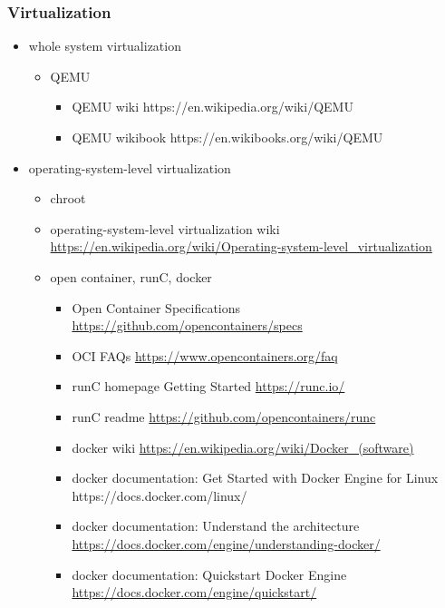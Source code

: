 \documentclass{article}
\begin{document}
\subsubsection{Virtualization}
%
\begin{itemize}
        \item whole system virtualization
            \begin{itemize}
                \item QEMU
                    \begin{itemize}
                        \item QEMU wiki https://en.wikipedia.org/wiki/QEMU
                        \item QEMU wikibook https://en.wikibooks.org/wiki/QEMU
                    \end{itemize}
            \end{itemize}
        \item operating-system-level virtualization
            \begin{itemize}
                \item chroot
                \item operating-system-level virtualization wiki \url{https://en.wikipedia.org/wiki/Operating-system-level_virtualization}
                \item open container, runC, docker
                    \begin{itemize}
                        \item Open Container Specifications \url{https://github.com/opencontainers/specs}
                        \item OCI FAQs \url{https://www.opencontainers.org/faq}
                        \item runC homepage Getting Started \url{https://runc.io/}
                        \item runC readme \url{https://github.com/opencontainers/runc}
                        \item docker wiki \url{https://en.wikipedia.org/wiki/Docker_(software)}
                        \item docker documentation: Get Started with Docker Engine for Linux https://docs.docker.com/linux/
                        \item docker documentation: Understand the architecture \url{https://docs.docker.com/engine/understanding-docker/}
                        \item docker documentation: Quickstart Docker Engine \url{https://docs.docker.com/engine/quickstart/}
                    \end{itemize}
            \end{itemize}
\end{itemize}
%
\end{document}
